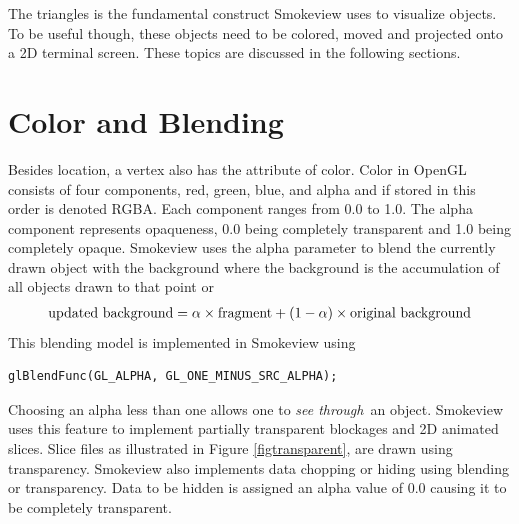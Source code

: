 \documentclass[11pt,twoside]{book}
\begin{document}
The triangles is the fundamental construct Smokeview uses to
visualize objects.  To be useful though, these objects need to be
colored, moved and projected onto a 2D terminal screen. These
topics are discussed in the following sections.

\chapter{Color and Blending}
Besides location, a vertex also has the attribute of color. Color
in OpenGL consists of four components, red, green, blue, and
alpha and if stored in this order is denoted RGBA. Each component ranges from 0.0 to 1.0. The alpha component
represents opaqueness, 0.0 being completely transparent and 1.0
being completely opaque. Smokeview uses the alpha parameter to
blend the currently drawn object with the background where the
background is the accumulation of all objects drawn to that point or
\begin{eqnarray*}
\noindent\mbox{updated background} = \alpha\times \mbox{fragment} + (1-\alpha)\times \mbox{original background}
\end{eqnarray*}
This blending model is implemented in Smokeview using
\begin{verbatim}
glBlendFunc(GL_ALPHA, GL_ONE_MINUS_SRC_ALPHA);
\end{verbatim}

Choosing an alpha less than one allows one to
{\em see through}\ an object. Smokeview uses this feature to implement
partially transparent blockages and 2D animated slices.
Slice files as illustrated in Figure
\ref{figtransparent}, are drawn using transparency. Smokeview also implements
data chopping or hiding using blending or transparency.  Data to be hidden is assigned an alpha
value of 0.0 causing it to be completely transparent.
\end{document}
